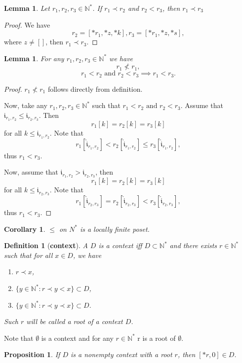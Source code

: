 \documentclass[10pt]{article}
\theoremstyle{plain}
\newtheorem{proposition}[theorem]{Proposition}
\newtheorem{definition}[theorem]{Definition}
\newtheorem{corollary}[theorem]{Corollary}
\newtheorem{lemma}[theorem]{Lemma}
\renewcommand{\i}{\mathfrak{i}}
\newcommand{\ii}{\hat{\mathfrak{i}}}
\newcommand{\N}{\mathbb{N}}
\begin{document}
\begin{lemma}
\label{prec-ord-trans}
Let $r_1, r_2, r_3\in \N^*$.
If $r_1 \prec r_2$ and $r_2 < r_3$, then $r_1 \prec r_3$
\end{lemma}
\begin{proof}
We have
$$
r_2 = [*r_1, *z, *k], r_3 = [*r_1, *z, *s],
$$
where $z\not=[]$, then $r_1 \prec r_3$.
\end{proof}

\begin{lemma}
For any $r_1, r_2, r_3\in\N^*$ we have
\begin{equation}
r_1 \not< r_1,
\end{equation}
\begin{equation}
r_1 < r_2 \text{ and } r_2 < r_3 \implies r_1 < r_3.
\end{equation}
\end{lemma}
\begin{proof}
$r_1 \not< r_1$ follows directly from definition.

Now, take any $r_1, r_2, r_3\in\N^*$ such that $r_1 < r_2 \text{ and } r_2 < r_3$.
Assume that $\i_{r_1, r_2} \leq \i_{r_2, r_3}$.
Then 
$$
r_1[k] = r_2[k] = r_3[k]
$$
for all $k \leq \i_{r_1, r_2}$.
Note that
$$
r_1[\ii_{r_1, r_2}] < r_2[\ii_{r_1, r_2}] \leq r_3[\ii_{r_1, r_2}],
$$
thus $r_1 < r_3$.

Now, assume that $\i_{r_1, r_2} > \i_{r_2, r_3}$, then
$$
r_1[k] = r_2[k] = r_3[k]
$$
for all $k \leq \i_{r_2, r_3}$. Note that
$$
r_1[\ii_{r_2, r_3}] = r_2[\ii_{r_2, r_3}] < r_3[\ii_{r_2, r_3}],
$$
thus $r_1 < r_3$.   
\end{proof}

\begin{corollary}
$\leq$ on $N^*$ is a locally finite poset.
\end{corollary}

\begin{definition}[\textbf{context}]
A $D$ is a context iff $D\subset \N^*$ and
there exists $r\in \N^*$ such that 
for all $x\in D$, we have
\begin{enumerate}
\item $r \prec x$,
\item $\{y \in \N^*: r \prec y < x \} \subset D$,
\item $\{y \in \N^*: r \prec y \prec x \} \subset D$.
\end{enumerate}
Such $r$ will be called a root of a context $D$.
\end{definition}

Note that $\emptyset$ is a context and for any $r\in\N^*$ r is a root of $\emptyset$.
\begin{proposition}
If $D$ is a nonempty context with a root $r$, then $[*r, 0]\in D$.
\end{proposition}
\end{document}
